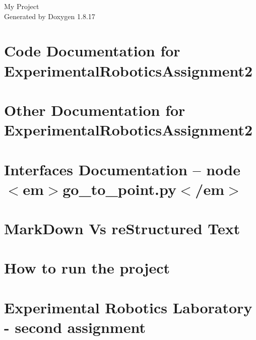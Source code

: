 \let\mypdfximage\pdfximage\def\pdfximage{\immediate\mypdfximage}\documentclass[twoside]{book}
\newcommand{\+}{\discretionary{\mbox{\scriptsize$\hookleftarrow$}}{}{}}
\newcommand{\clearemptydoublepage}{%
  \newpage{\pagestyle{empty}\cleardoublepage}%
}
\begin{document}
\hypersetup{pageanchor=false,
             bookmarksnumbered=true,
             pdfencoding=unicode
            }
\begin{titlepage}
\vspace*{7cm}
\begin{center}%
{\Large My Project }\\
\vspace*{1cm}
{\large Generated by Doxygen 1.8.17}\\
\end{center}
\end{titlepage}
\clearemptydoublepage
{}
\tableofcontents
\clearemptydoublepage
{}
\hypersetup{pageanchor=true}

\chapter{Code Documentation for Experimental\+Robotics\+Assignment2}
\label{md_code_documentation_index}

\chapter{Other Documentation for Experimental\+Robotics\+Assignment2}
\label{md_documents_index}

\chapter{Interfaces Documentation -- node $<$em$>$go\+\_\+to\+\_\+point.\+py$<$/em$>$}
\label{md_documents_interfaces-docs-goto-point}

\chapter{Mark\+Down Vs re\+Structured Text}
\label{md_documents_markdown-vs-rest}

\chapter{How to run the project}
\label{md_documents_run-the-project}

\chapter{Experimental Robotics Laboratory -\/ second assignment}
\label{md__r_e_a_d_m_e}

\end{document}
